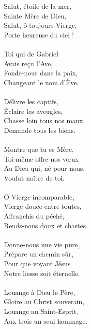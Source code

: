 Salut, étoile de la mer,\\
Sainte Mère de Dieu,\\
Salut, ô toujours Vierge,\\
Porte heureuse du ciel !\\
\\
Toi qui de Gabriel\\
Avais reçu l’Ave,\\
Fonde-nous dans la paix,\\
Changeant le nom d’Ève.\\
\\
Délivre les captifs,\\
Éclaire les aveugles,\\
Chasse loin tous nos maux,\\
Demande tous les biens.\\
\\
Montre que tu es Mère,\\
Toi-même offre nos vœux\\
Au Dieu qui, né pour nous,\\
Voulut naître de toi.\\
\\
Ô Vierge incomparable,\\
Vierge douce entre toutes,\\
Affranchis du péché,\\
Rends-nous doux et chastes.\\
\\
Donne-nous une vie pure,\\
Prépare un chemin sûr,\\
Pour que voyant Jésus\\
Notre liesse soit éternelle.\\
\\
Louange à Dieu le Père,\\
Gloire au Christ souverain,\\
Louange au Saint-Esprit,\\
Aux trois un seul hommage.
